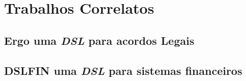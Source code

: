 \chapter{Trabalhos Correlatos}
\label{chap:trabalhoscorrelatos}


\section{Ergo uma \textit{DSL} para acordos Legais}
\label{ergo}


\section{DSLFIN uma \textit{DSL} para sistemas financeiros}
\label{ergo}